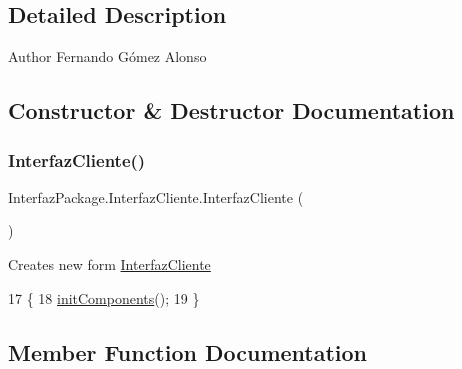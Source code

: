 \subsection{Detailed Description}
\begin{DoxyAuthor}{Author}
Fernando Gómez Alonso 
\end{DoxyAuthor}


\subsection{Constructor \& Destructor Documentation}
\mbox{\label{class_interfaz_package_1_1_interfaz_cliente_a7e351585e987550c8e46079535f65537}} 
\subsubsection{\texorpdfstring{Interfaz\+Cliente()}{InterfazCliente()}}
{\footnotesize\ttfamily Interfaz\+Package.\+Interfaz\+Cliente.\+Interfaz\+Cliente (\begin{DoxyParamCaption}{ }\end{DoxyParamCaption})\hspace{0.3cm}{\ttfamily [inline]}}

Creates new form \mbox{\hyperlink{class_interfaz_package_1_1_interfaz_cliente}{Interfaz\+Cliente}} 
\begin{DoxyCode}
17                              \{
18         \mbox{\hyperlink{class_interfaz_package_1_1_interfaz_cliente_ae58f2a5fe5f253614b532402d9d86dfe}{initComponents}}();
19     \}
\end{DoxyCode}


\subsection{Member Function Documentation}
\mbox{\label{class_interfaz_package_1_1_interfaz_cliente_ae58f2a5fe5f253614b532402d9d86dfe}} 

